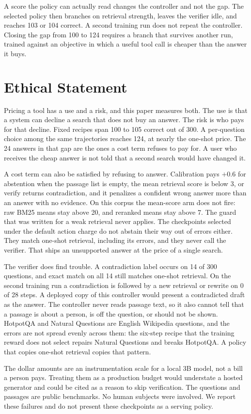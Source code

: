 \documentclass[letterpaper]{article} %
\begin{document}
A score the policy can actually read changes the controller and not the gap. The selected policy then branches on retrieval strength, leaves the verifier idle, and reaches 103 or 104 correct. A second training run does not repeat the controller. Closing the gap from 100 to 124 requires a branch that survives another run, trained against an objective in which a useful tool call is cheaper than the answer it buys.

\section*{Ethical Statement}
Pricing a tool has a use and a risk, and this paper measures both. The use is that a system can decline a search that does not buy an answer. The risk is who pays for that decline. Fixed recipes span 100 to 105 correct out of 300. A per-question choice among the same trajectories reaches 124, at nearly the one-shot price. The 24 answers in that gap are the ones a cost term refuses to pay for. A user who receives the cheap answer is not told that a second search would have changed it.

A cost term can also be satisfied by refusing to answer. Calibration pays \(+0.6\) for abstention when the passage list is empty, the mean retrieval score is below 3, or verify returns contradiction, and it penalizes a confident wrong answer more than an answer with no evidence. On this corpus the mean-score arm does not fire: raw BM25 means stay above 20, and reranked means stay above 7. The guard that was written for a weak retrieval never applies. The checkpoints selected under the default action charge do not abstain their way out of errors either. They match one-shot retrieval, including its errors, and they never call the verifier. That ships an unsupported answer at the price of a single search.

The verifier does find trouble. A contradiction label occurs on 14 of 300 questions, and exact match on all 14 still matches one-shot retrieval. On the second training run a contradiction is followed by a new retrieval or rewrite on 0 of 28 steps. A deployed copy of this controller would present a contradicted draft as the answer. The controller never reads passage text, so it also cannot tell that a passage is about a person, is off the question, or should not be shown. HotpotQA and Natural Questions are English Wikipedia questions, and the errors are not spread evenly across them: the six-step recipe that the training reward does not select repairs Natural Questions and breaks HotpotQA. A policy that copies one-shot retrieval copies that pattern.

The dollar amounts are an instrumentation scale for a local 3B model, not a bill a person pays. Treating them as a production budget would understate a hosted generator and could be cited as a reason to skip verification. The questions and passages are public benchmarks. No human subjects were involved. We report these failures and do not present these checkpoints as a serving policy.


\end{document}

